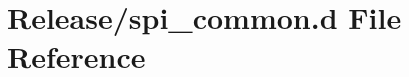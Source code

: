 \hypertarget{spi__common_8d}{}\section{Release/spi\+\_\+common.d File Reference}
\label{spi__common_8d}
